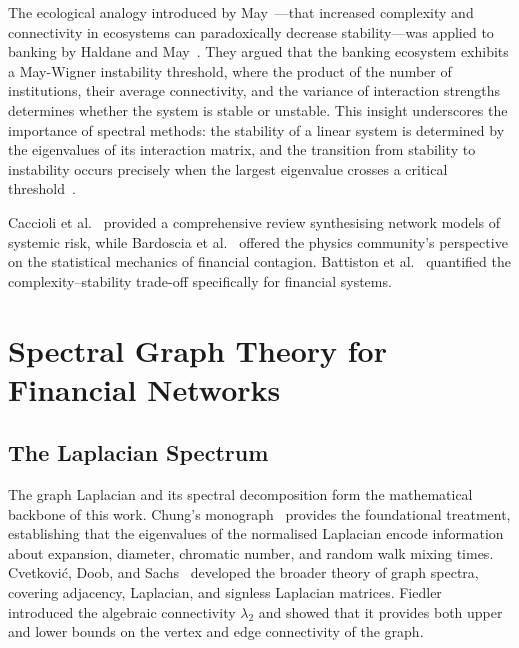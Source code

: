 The ecological analogy introduced by May~\cite{may1972will}---that
increased complexity and connectivity in ecosystems can paradoxically
decrease stability---was applied to banking by Haldane and
May~\cite{haldane2011systemic}.  They argued that the banking ecosystem
exhibits a May-Wigner instability threshold, where the product of the
number of institutions, their average connectivity, and the variance of
interaction strengths determines whether the system is stable or unstable.
This insight underscores the importance of spectral methods: the
stability of a linear system is determined by the eigenvalues of its
interaction matrix, and the transition from stability to instability
occurs precisely when the largest eigenvalue crosses a critical
threshold~\cite{may1972will}.

Caccioli et al.~\cite{caccioli2018network} provided a comprehensive
review synthesising network models of systemic risk, while Bardoscia et
al.~\cite{bardoscia2021physics} offered the physics community's
perspective on the statistical mechanics of financial contagion.
Battiston et al.~\cite{battiston2016price} quantified the complexity--stability
trade-off specifically for financial systems.


\section{Spectral Graph Theory for Financial Networks}
\label{sec:spectral_background}

\subsection{The Laplacian Spectrum}
\label{sec:laplacian_spectrum}

The graph Laplacian and its spectral decomposition form the mathematical
backbone of this work.  Chung's monograph~\cite{chung1997spectral}
provides the foundational treatment, establishing that the eigenvalues
of the normalised Laplacian encode information about expansion,
diameter, chromatic number, and random walk mixing times.  Cvetkovi\'c,
Doob, and Sachs~\cite{cvetkovic1995spectra} developed the broader theory
of graph spectra, covering adjacency, Laplacian, and signless Laplacian
matrices.  Fiedler~\cite{fiedler1973algebraic} introduced the algebraic
connectivity $\lambda_2$ and showed that it provides both upper and
lower bounds on the vertex and edge connectivity of the graph.


